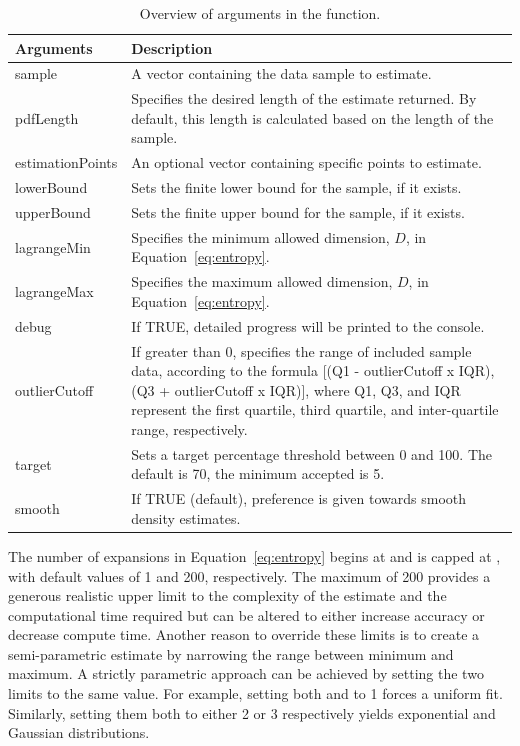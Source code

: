 \begin{table}[t!]
\centering
\begin{tabular}{lp{10.4cm}}
\toprule
Arguments     & Description \\ \midrule
sample        & A vector containing the data sample to estimate.\\
pdfLength     & Specifies the desired length of the estimate returned. By default, this length is calculated based on the length of the sample. \\
estimationPoints & An optional vector containing specific points to estimate.\\
lowerBound    & Sets the finite lower bound for the sample, if it exists.\\
upperBound    & Sets the finite upper bound for the sample, if it exists.\\
lagrangeMin   & Specifies the minimum allowed dimension, $D$, in Equation~\ref{eq:entropy}. \\
lagrangeMax   & Specifies the maximum allowed dimension, $D$, in Equation~\ref{eq:entropy}. \\
debug         & If TRUE, detailed progress will be printed to the console.\\
outlierCutoff & If greater than 0, specifies the range of included sample data, according to the formula [(Q1 - outlierCutoff x IQR),  (Q3 + outlierCutoff x IQR)], where Q1, Q3, and IQR represent the first quartile, third quartile, and inter-quartile range, respectively. \\ 
target        & Sets a target percentage threshold between 0 and 100.
The default is 70, the minimum accepted is 5.\\
smooth        & If TRUE (default), preference is given towards smooth density estimates. \\ \bottomrule
\end{tabular}
\caption{\label{tab:arguments1} Overview of arguments in the  function.}
\end{table}

The number of expansions in Equation~\ref{eq:entropy} begins at  and is capped at , with default values of 1 and 200, respectively. The maximum of 200 provides a generous realistic upper limit to the complexity of the estimate and the computational time required but can be altered to either increase accuracy or decrease compute time. Another reason to override these limits is to create a semi-parametric estimate by narrowing the range between minimum and maximum.  A strictly parametric approach can be achieved by setting the two limits to the same value. For example, setting both  and  to 1 forces a uniform fit. Similarly, setting them both to either 2 or 3 respectively yields exponential and Gaussian distributions.

